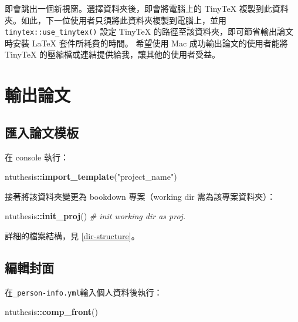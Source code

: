 \documentclass[oneside]{book}
\newenvironment{Shaded}{\begin{snugshade}}{\end{snugshade}}
\newcommand{\CommentTok}[1]{\textcolor[rgb]{0.56,0.35,0.01}{\textit{#1}}}
\newcommand{\KeywordTok}[1]{\textcolor[rgb]{0.13,0.29,0.53}{\textbf{#1}}}
\newcommand{\NormalTok}[1]{#1}
\newcommand{\OperatorTok}[1]{\textcolor[rgb]{0.81,0.36,0.00}{\textbf{#1}}}
\newcommand{\StringTok}[1]{\textcolor[rgb]{0.31,0.60,0.02}{#1}}
\theoremstyle{definition}
\theoremstyle{definition}
\theoremstyle{definition}
\theoremstyle{remark}
\begin{document}
即會跳出一個新視窗。選擇資料夾後，即會將電腦上的 TinyTeX 複製到此資料夾。如此，下一位使用者只須將此資料夾複製到電腦上，並用 \texttt{tinytex::use\_tinytex()} 設定 TinyTeX 的路徑至該資料夾，即可節省輸出論文時安裝 LaTeX 套件所耗費的時間。
希望使用 Mac 成功輸出論文的使用者能將 TinyTeX 的壓縮檔或連結提供給我，讓其他的使用者受益。

\hypertarget{export-thesis}{%
\chapter{輸出論文}\label{export-thesis}}

\hypertarget{import-template}{%
\section{匯入論文模板}\label{import-template}}

在 console 執行：

\begin{Shaded}
\begin{Highlighting}[]
\NormalTok{ntuthesis}\OperatorTok{::}\KeywordTok{import_template}\NormalTok{(}\StringTok{"project_name"}\NormalTok{)}
\end{Highlighting}
\end{Shaded}

接著將該資料夾變更為 bookdown 專案（working dir 需為該專案資料夾）：

\begin{Shaded}
\begin{Highlighting}[]
\NormalTok{ntuthesis}\OperatorTok{::}\KeywordTok{init_proj}\NormalTok{()  }\CommentTok{# init working dir as proj.}
\end{Highlighting}
\end{Shaded}

詳細的檔案結構，見 \ref{dir-structure}。

\hypertarget{edit-front-matter}{%
\section{編輯封面}\label{edit-front-matter}}

在\texttt{\_person-info.yml}輸入個人資料後執行：

\begin{Shaded}
\begin{Highlighting}[]
\NormalTok{ntuthesis}\OperatorTok{::}\KeywordTok{comp_front}\NormalTok{()}
\end{Highlighting}
\end{Shaded}
\end{document}

